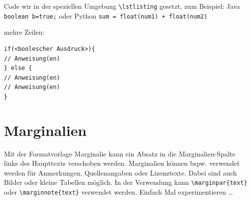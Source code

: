 \lstset{language=TEX}
Code wir in der speziellen Umgebung \lstinline$\lstlisting$ gesetzt, zum Beispiel: Java \lstset{language=Java} \lstinline$boolean b=true;$ oder Python \lstset{language=Python} \lstinline$sum = float(num1) + float(num2)$ 

mehre Zeilen:
\begin{lstlisting}
if(<boolescher Ausdruck>){
// Anweisung(en)
} else {
// Anweisung(en)
// Anweisung(en)
}
\end{lstlisting}

\newpage
\section{Marginalien}
\leavevmode
{}
Mit der Formatvorlage Marginalie kann ein Absatz in die Marginalien-Spalte links des Haupttexts verschoben werden. Marginalien können bspw. verwendet werden für Anmerkungen, Quellenangaben oder Lizenztexte.
Dabei sind auch Bilder oder kleine Tabellen möglich.
In der Verwendung kann \lstinline$\marginpar{text}$ oder \lstinline$\marginnote{text}$ verwendet werden. Einfach Mal experimentieren \dots

          

